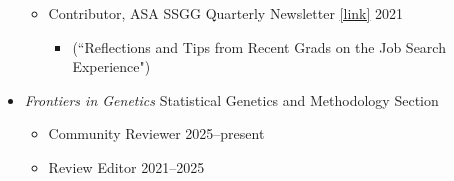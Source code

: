 \documentclass[margin]{res}
\begin{document}
\begin{resume}
\begin{itemize}
\begin{itemize}
		\item Contributor, ASA SSGG Quarterly Newsletter \href{https://higherlogicdownload.s3.amazonaws.com/AMSTAT/6d11267c-5862-4c31-9f1e-f5a52a11ea5f/UploadedImages/Newsletters/Newsletter_SSGG_2021Sept_final.pdf}{[link]} \hfill 2021
			\begin{itemize}[leftmargin=-0in] \vspace{-0.2cm}
			\item[]  \begin{footnotesize}(``Reflections and Tips from Recent Grads on the Job Search Experience") \end{footnotesize}
			\end{itemize} %
		
		\end{itemize}
		
	\item \textit{Frontiers in Genetics} Statistical Genetics and Methodology Section
	  \begin{itemize}
	  \item Community Reviewer \hfill 2025--present
	  \item Review Editor \hfill 2021--2025
	  \end{itemize}
	

\end{itemize}
\end{resume}
\end{document}

